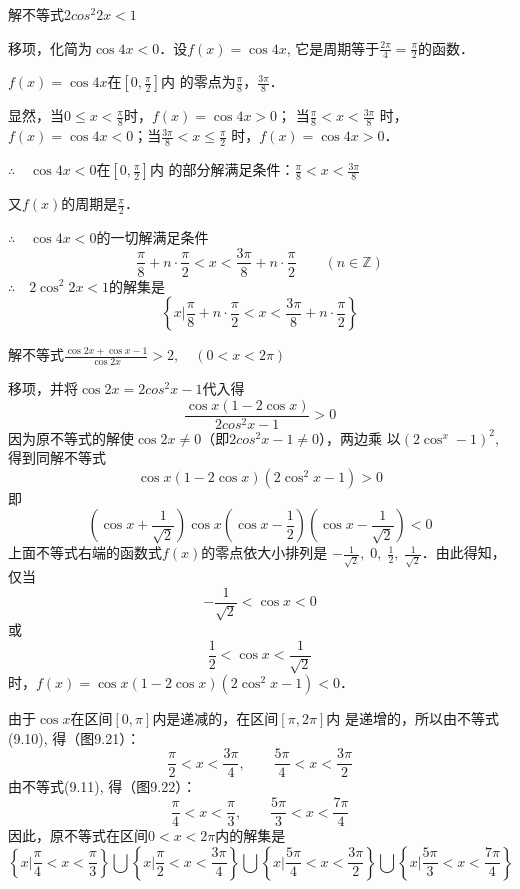 \begin{example}
    解不等式$2cos^2 2x<1$
\end{example}

\begin{solution}
移项，化简为$\cos4x<0$．设$f(x)=\cos4x$, 它是周期等于$\frac{2\pi}{4}=\frac{\pi}{2}$的函数．

$f(x)=\cos4x$在$\left[0,\frac{\pi}{2}\right]$内
的零点为$\frac{\pi}{8}$，$\frac{3\pi}{8}$．

显然，当$0\le x<\frac{\pi}{8}$时，$f(x)=\cos4x>0$；
当$\frac{\pi}{8}<x<\frac{3\pi}{8}$
时，$f(x)=\cos4x<0$；当$\frac{3\pi}{8}<x\le \frac{\pi}{2}$
时，$f(x)=\cos4x>0$．

$\therefore\quad \cos4x<0$在$\left[0,\frac{\pi}{2}\right]$内
的部分解满足条件：$\frac{\pi}{8}<x<\frac{3\pi}{8}$

又$f(x)$的周期是$\frac{\pi}{2}$．

$\therefore\quad \cos4x<0$的一切解满足条件
\[\frac{\pi}{8}+n\cdot\frac{\pi}{2}<x<\frac{3\pi}{8}+n\cdot\frac{\pi}{2}\qquad (n\in\mathbb{Z})\]
$\therefore\quad 2\cos^2 2x<1$的解集是
\[\left\{x\Big| \frac{\pi}{8}+n\cdot\frac{\pi}{2}<x<\frac{3\pi}{8}+n\cdot\frac{\pi}{2}\right\}\]
\end{solution}


\begin{example}
    解不等式$\frac{\cos2x+\cos x-1}{\cos2x}>2,\quad (0<x<2\pi)$
\end{example}

\begin{solution}
    移项，并将$\cos2x=2cos^2x-1$代入得
   \[\frac{\cos x(1-2\cos x)}{2cos^2x-1}>0\] 
    因为原不等式的解使$\cos2x\ne 0$（即$2cos^2x-1\ne 0$），两边乘
    以$(2\cos^x-1)^2$, 得到同解不等式
 \[   \cos x(1-2\cos x)(2\cos^2x-1)>0\]
    即
\[\left(\cos x+\frac{1}{\sqrt{2}}\right)\cos x\left(\cos x-\frac{1}{2}\right)\left(\cos x-\frac{1}{\sqrt{2}}\right)<0\]
上面不等式右端的函数式$f(x)$的零点依大小排列是
$-\frac{1}{\sqrt{2}},\; 0,\; \frac{1}{2},\; \frac{1}{\sqrt{2}}$．由此得知，仅当
\begin{equation}
    -\frac{1}{\sqrt{2}}<\cos x<0
\end{equation}
或
\begin{equation}
    \frac{1}{2}<\cos x<\frac{1}{\sqrt{2}}
\end{equation}
时，$f(x)=\cos x(1-2\cos x)(2\cos^2x-1)<0$．

由于$\cos x$在区间$[0,\pi]$内是递减的，在区间$[\pi,2\pi]$内
是递增的，所以由不等式(9.10), 得（图9.21）：
\[\frac{\pi}{2}<x<\frac{3\pi}{4},\qquad \frac{5\pi}{4}<x<\frac{3\pi}{2}\]
由不等式(9.11), 得（图9.22）：
\[\frac{\pi}{4}<x<\frac{\pi}{3},\qquad \frac{5\pi}{3}<x<\frac{7\pi}{4}\]
因此，原不等式在区间$0<x<2\pi$内的解集是
\[\left\{x\Big|\frac{\pi}{4}<x<\frac{\pi}{3} \right\}\bigcup\left\{x\Big|\frac{\pi}{2}<x<\frac{3\pi}{4} \right\}\bigcup\left\{x\Big|\frac{5\pi}{4}<x<\frac{3\pi}{2} \right\}\bigcup\left\{x\Big|\frac{5\pi}{3}<x<\frac{7\pi}{4} \right\}\]
\end{solution}


